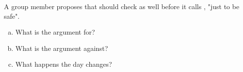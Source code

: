\label{ex:5:5}
A group member proposes that  should check  as well before it calls
, "just to be safe".
\begin{enumerate}[a)]
  \item What is the argument for?
  \item What is the argument against?
  \item What happens the day  changes?
\end{enumerate}
